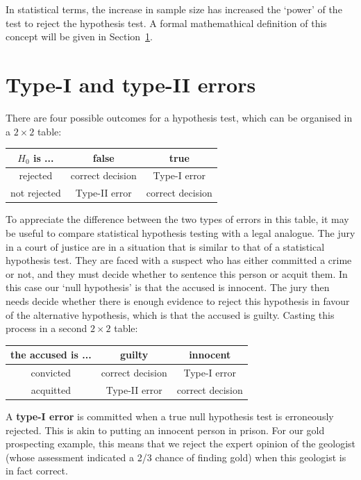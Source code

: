 In statistical terms, the increase in sample size has increased the
`power' of the test to reject the hypothesis test. A formal
mathemathical definition of this concept will be given in
Section~\ref{sec:typeI&II}.

\section{Type-I and type-II errors}
\label{sec:typeI&II}

There are four possible outcomes for a hypothesis test, which can be
organised in a ${2}\times{2}$ table:

\begin{center}
\begin{tabular}{c|cc}
  $H_0$ is ... & false & true \\ \hline
  rejected & correct decision & Type-I error \\
  not rejected & Type-II error & correct decision
\end{tabular}
\end{center}

To appreciate the difference between the two types of errors in this
table, it may be useful to compare statistical hypothesis testing with
a legal analogue. The jury in a court of justice are in a situation
that is similar to that of a statistical hypothesis test. They are
faced with a suspect who has either committed a crime or not, and they
must decide whether to sentence this person or acquit them.  In this
case our `null hypothesis' is that the accused is innocent.  The jury
then needs decide whether there is enough evidence to reject this
hypothesis in favour of the alternative hypothesis, which is that the
accused is guilty. Casting this process in a second ${2}\times{2}$
table:

\begin{center}
\begin{tabular}{c|cc}
  the accused is ... & guilty & innocent \\ \hline
  convicted & correct decision & Type-I error \\
  acquitted & Type-II error & correct decision
\end{tabular}
\end{center}

A \textbf{type-I error} is committed when a true null hypothesis test
is erroneously rejected. This is akin to putting an innocent person in
prison. For our gold prospecting example, this means that we reject
the expert opinion of the geologist (whose assessment indicated a 2/3
chance of finding gold) when this geologist is in fact
correct.\medskip

